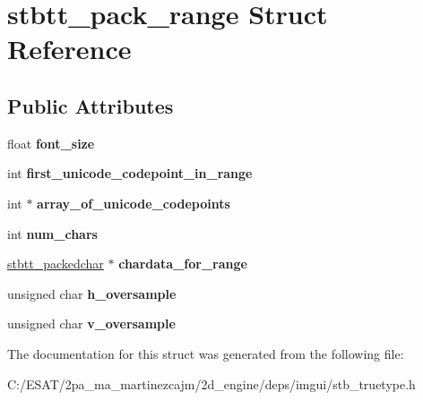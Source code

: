 \hypertarget{structstbtt__pack__range}{}\section{stbtt\+\_\+pack\+\_\+range Struct Reference}
\label{structstbtt__pack__range}
\subsection*{Public Attributes}
\begin{DoxyCompactItemize}
\item 
\mbox{\label{structstbtt__pack__range_a296916dc971e5e7627822fe98dc42828}} 
float {\bfseries font\+\_\+size}
\item 
\mbox{\label{structstbtt__pack__range_a3b414cbee1e164c29dd138e0ae3d5759}} 
int {\bfseries first\+\_\+unicode\+\_\+codepoint\+\_\+in\+\_\+range}
\item 
\mbox{\label{structstbtt__pack__range_a1567aa5455e1251529a91b46261368cf}} 
int $\ast$ {\bfseries array\+\_\+of\+\_\+unicode\+\_\+codepoints}
\item 
\mbox{\label{structstbtt__pack__range_a046d65b6ffb65fb998d471ba098e2e23}} 
int {\bfseries num\+\_\+chars}
\item 
\mbox{\label{structstbtt__pack__range_aa8f7ddd637ed341ea39b08466fab9284}} 
\hyperlink{structstbtt__packedchar}{stbtt\+\_\+packedchar} $\ast$ {\bfseries chardata\+\_\+for\+\_\+range}
\item 
\mbox{\label{structstbtt__pack__range_a7a642139ce446c58fde5c48553bcf008}} 
unsigned char {\bfseries h\+\_\+oversample}
\item 
\mbox{\label{structstbtt__pack__range_a6288f14006e257544db3d015c32b4113}} 
unsigned char {\bfseries v\+\_\+oversample}
\end{DoxyCompactItemize}


The documentation for this struct was generated from the following file\+:\begin{DoxyCompactItemize}
\item 
C\+:/\+E\+S\+A\+T/2pa\+\_\+ma\+\_\+martinezcajm/2d\+\_\+engine/deps/imgui/stb\+\_\+truetype.\+h\end{DoxyCompactItemize}
